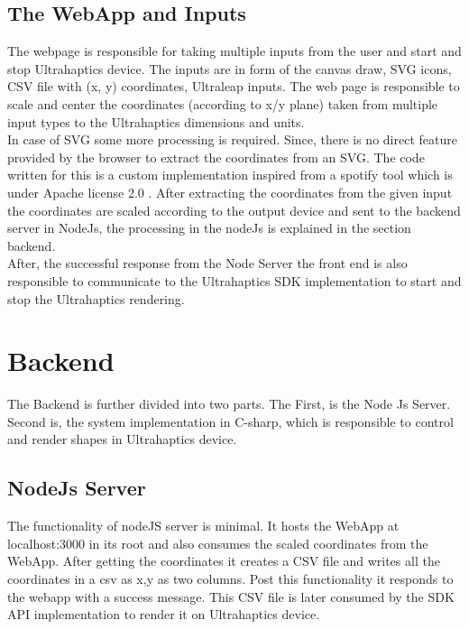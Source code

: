 \subsection*{The WebApp and Inputs}
The webpage is responsible for taking multiple inputs from the user and start and stop Ultrahaptics device.
The inputs are in form of the canvas draw, SVG icons, CSV file with (x, y) coordinates, Ultraleap inputs. 
The web page is responsible to scale and center the coordinates (according to x/y plane) taken from multiple input types to the 
Ultrahaptics dimensions and units.\\
In case of SVG some more processing is required. Since, there is no direct feature provided by the 
browser to extract the coordinates from an SVG. The code written for this is a custom implementation inspired from a 
spotify tool\cite{spotify-coordinator} which is under Apache license 2.0 . After extracting the coordinates from the 
given input the coordinates are scaled according to the output device and sent to the backend server in NodeJs, 
the processing in the nodeJs is explained in the section backend. \\
After, the successful response from the Node Server the front end is also responsible to communicate to the 
Ultrahaptics SDK implementation to start and stop the Ultrahaptics rendering.

\section{Backend}

The Backend is further divided into two parts. The First, is the Node Js Server. Second is, the system implementation 
in C-sharp, which is responsible to control and render shapes in Ultrahaptics device. \\[4mm]
\subsection*{NodeJs Server} 
The functionality of nodeJS server is minimal. It hosts the WebApp at localhost:3000 in its root and also 
consumes the scaled coordinates from the WebApp. After getting the coordinates it creates a CSV file and writes 
all the coordinates in a csv as x,y as two columns. Post this functionality it responds to the webapp with a success message. 
This CSV file is later consumed by the SDK API implementation to render it on Ultrahaptics device.\\[4mm]

